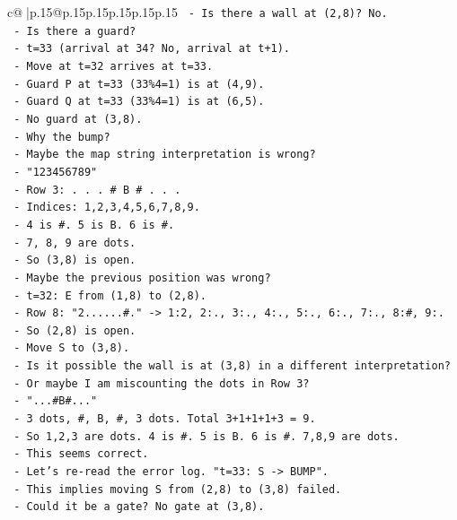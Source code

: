 \documentclass{article}
\begin{document}
{\begin{supertabular}{c@{$\;$}|p{.15\linewidth}@{}p{.15\linewidth}p{.15\linewidth}p{.15\linewidth}p{.15\linewidth}p{.15\linewidth}}
{{{\texttt{  {-} Is there a wall at (2,8)? No.} \\
\texttt{  {-} Is there a guard?} \\
\texttt{    {-} t=33 (arrival at 34? No, arrival at t+1).} \\
\texttt{    {-} Move at t=32 arrives at t=33.} \\
\texttt{    {-} Guard P at t=33 (33\%4=1) is at (4,9).} \\
\texttt{    {-} Guard Q at t=33 (33\%4=1) is at (6,5).} \\
\texttt{    {-} No guard at (3,8).} \\
\texttt{  {-} Why the bump?} \\
\texttt{  {-} Maybe the map string interpretation is wrong?} \\
\texttt{  {-} "123456789"} \\
\texttt{  {-} Row 3: . . . \# B \# . . .} \\
\texttt{  {-} Indices: 1,2,3,4,5,6,7,8,9.} \\
\texttt{  {-} 4 is \#. 5 is B. 6 is \#.} \\
\texttt{  {-} 7, 8, 9 are dots.} \\
\texttt{  {-} So (3,8) is open.} \\
\texttt{  {-} Maybe the previous position was wrong?} \\
\texttt{  {-} t=32: E from (1,8) to (2,8).} \\
\texttt{  {-} Row 8: "2......\#." {-}> 1:2, 2:., 3:., 4:., 5:., 6:., 7:., 8:\#, 9:.} \\
\texttt{  {-} So (2,8) is open.} \\
\texttt{  {-} Move S to (3,8).} \\
\texttt{  {-} Is it possible the wall is at (3,8) in a different interpretation?} \\
\texttt{  {-} Or maybe I am miscounting the dots in Row 3?} \\
\texttt{  {-} "...\#B\#..."} \\
\texttt{  {-} 3 dots, \#, B, \#, 3 dots. Total 3+1+1+1+3 = 9.} \\
\texttt{  {-} So 1,2,3 are dots. 4 is \#. 5 is B. 6 is \#. 7,8,9 are dots.} \\
\texttt{  {-} This seems correct.} \\
\texttt{  {-} Let's re{-}read the error log. "t=33: S {-}> BUMP".} \\
\texttt{  {-} This implies moving S from (2,8) to (3,8) failed.} \\
\texttt{  {-} Could it be a gate? No gate at (3,8).} \\
}}}
\end{supertabular}}
\end{document}
